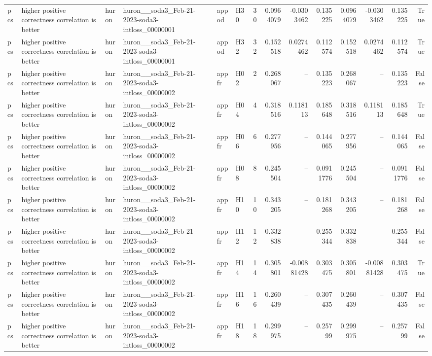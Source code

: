 \begin{longtable}{llllllrrrrrrrr}
pcs & higher positive correctness correlation is better & huron & huron\_\_soda3\_Feb-21-2023-soda3-intloss\_00000001 & appod & H30 & 30 & 0.0964079 & -0.0303462 & 0.135225 & 0.0964079 & -0.0303462 & 0.135225 & True \\
pcs & higher positive correctness correlation is better & huron & huron\_\_soda3\_Feb-21-2023-soda3-intloss\_00000001 & appod & H32 & 32 & 0.152518 & 0.0274462 & 0.112574 & 0.152518 & 0.0274462 & 0.112574 & True \\
pcs & higher positive correctness correlation is better & huron & huron\_\_soda3\_Feb-21-2023-soda3-intloss\_00000002 & appfr & H02 & 2 & 0.268067 & -- & 0.135223 & 0.268067 & -- & 0.135223 & False \\
pcs & higher positive correctness correlation is better & huron & huron\_\_soda3\_Feb-21-2023-soda3-intloss\_00000002 & appfr & H04 & 4 & 0.318516 & 0.118113 & 0.185648 & 0.318516 & 0.118113 & 0.185648 & True \\
pcs & higher positive correctness correlation is better & huron & huron\_\_soda3\_Feb-21-2023-soda3-intloss\_00000002 & appfr & H06 & 6 & 0.277956 & -- & 0.144065 & 0.277956 & -- & 0.144065 & False \\
pcs & higher positive correctness correlation is better & huron & huron\_\_soda3\_Feb-21-2023-soda3-intloss\_00000002 & appfr & H08 & 8 & 0.245504 & -- & 0.0911776 & 0.245504 & -- & 0.0911776 & False \\
pcs & higher positive correctness correlation is better & huron & huron\_\_soda3\_Feb-21-2023-soda3-intloss\_00000002 & appfr & H10 & 10 & 0.343205 & -- & 0.181268 & 0.343205 & -- & 0.181268 & False \\
pcs & higher positive correctness correlation is better & huron & huron\_\_soda3\_Feb-21-2023-soda3-intloss\_00000002 & appfr & H12 & 12 & 0.332838 & -- & 0.255344 & 0.332838 & -- & 0.255344 & False \\
pcs & higher positive correctness correlation is better & huron & huron\_\_soda3\_Feb-21-2023-soda3-intloss\_00000002 & appfr & H14 & 14 & 0.305801 & -0.00881428 & 0.303475 & 0.305801 & -0.00881428 & 0.303475 & True \\
pcs & higher positive correctness correlation is better & huron & huron\_\_soda3\_Feb-21-2023-soda3-intloss\_00000002 & appfr & H16 & 16 & 0.260439 & -- & 0.307435 & 0.260439 & -- & 0.307435 & False \\
pcs & higher positive correctness correlation is better & huron & huron\_\_soda3\_Feb-21-2023-soda3-intloss\_00000002 & appfr & H18 & 18 & 0.299975 & -- & 0.25799 & 0.299975 & -- & 0.25799 & False \\

\end{longtable}
